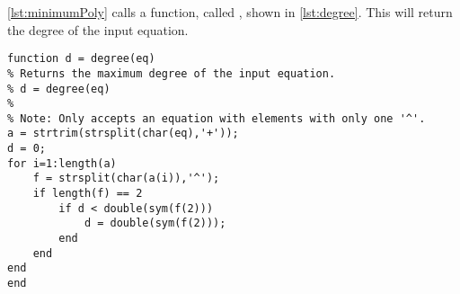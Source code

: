 \documentclass[Main]{subfiles}
\begin{document}
\codeTitle \ref{lst:minimumPoly} calls a function, called , shown in \codeTitle \ref{lst:degree}.
This will return the degree of the input equation.

\begin{lstlisting}[caption=Degree, style=Code-Matlab, label=lst:degree]
function d = degree(eq)
% Returns the maximum degree of the input equation.
% d = degree(eq)
%
% Note: Only accepts an equation with elements with only one '^'.
a = strtrim(strsplit(char(eq),'+'));
d = 0;
for i=1:length(a)
    f = strsplit(char(a(i)),'^');
    if length(f) == 2
        if d < double(sym(f(2)))
            d = double(sym(f(2)));
        end
    end
end
end
\end{lstlisting}
\end{document}
